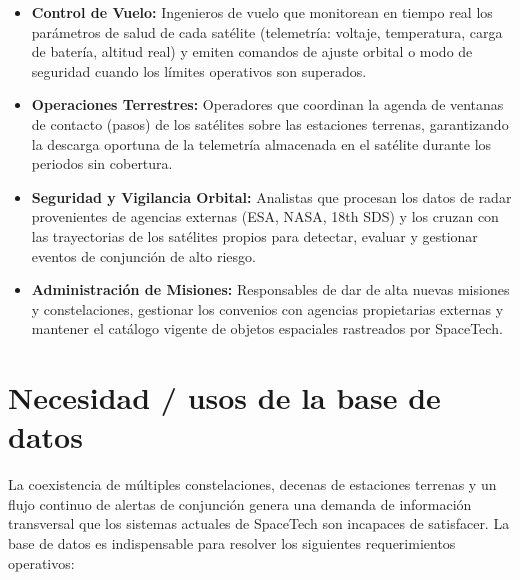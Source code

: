 \begin{itemize}
    \item \textbf{Control de Vuelo:} Ingenieros de vuelo que monitorean en tiempo real los parámetros de salud de cada satélite (telemetría: voltaje, temperatura, carga de batería, altitud real) y emiten comandos de ajuste orbital o modo de seguridad cuando los límites operativos son superados.
    \item \textbf{Operaciones Terrestres:} Operadores que coordinan la agenda de ventanas de contacto (pasos) de los satélites sobre las estaciones terrenas, garantizando la descarga oportuna de la telemetría almacenada en el satélite durante los periodos sin cobertura.
    \item \textbf{Seguridad y Vigilancia Orbital:} Analistas que procesan los datos de radar provenientes de agencias externas (ESA, NASA, 18th SDS) y los cruzan con las trayectorias de los satélites propios para detectar, evaluar y gestionar eventos de conjunción de alto riesgo.
    \item \textbf{Administración de Misiones:} Responsables de dar de alta nuevas misiones y constelaciones, gestionar los convenios con agencias propietarias externas y mantener el catálogo vigente de objetos espaciales rastreados por SpaceTech.
\end{itemize}

\section{Necesidad / usos de la base de datos}

La coexistencia de múltiples constelaciones, decenas de estaciones terrenas y un flujo continuo de alertas de conjunción genera una demanda de información transversal que los sistemas actuales de SpaceTech son incapaces de satisfacer. La base de datos es indispensable para resolver los siguientes requerimientos operativos:

